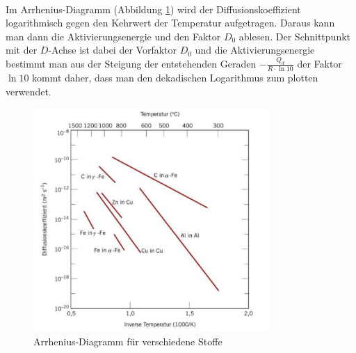 \documentclass[11pt,a4paper]{article}
\numberwithin{equation}{section}
\numberwithin{figure}{section}
\begin{document}
\\
\begin{addmargin}[25pt]{0pt}
Im Arrhenius-Diagramm (Abbildung \ref{fig:arrhenius}) wird der Diffusionskoeffizient logarithmisch gegen den Kehrwert der Temperatur aufgetragen. Daraus kann man dann die Aktivierungsenergie und den Faktor $D_0$ ablesen. Der Schnittpunkt mit der $D$-Achse ist dabei der Vorfaktor $D_0$ und die Aktivierungsenergie bestimmt man aus der Steigung der entstehenden Geraden $-\frac{Q_d}{R\cdot\ln{10}}$ der Faktor $\ln{10}$ kommt daher, dass man den dekadischen Logarithmus zum plotten verwendet.\\
\begin{figure}[h]
    \centering
    \includegraphics[width = 0.8\textwidth]{images/Materialwissenschaften/Arrhenius.jpeg}
    \caption{Arrhenius-Diagramm für verschiedene Stoffe}
    \label{fig:arrhenius}
\end{figure}
\end{addmargin} 
\end{document}
